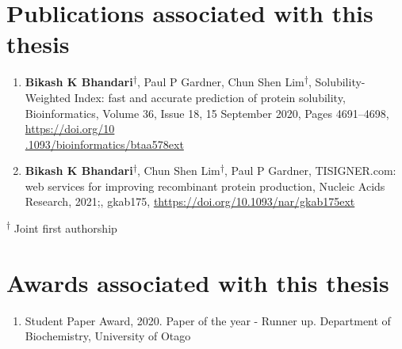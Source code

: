 \section*{Publications associated with this thesis}
\begin{enumerate}
	\item \textbf{Bikash K Bhandari}\textsuperscript{$\dagger$}, Paul P Gardner, Chun Shen Lim\textsuperscript{$\dagger$}, Solubility-Weighted Index: fast and accurate prediction of protein solubility, Bioinformatics, Volume 36, Issue 18, 15 September 2020, Pages 4691–4698, \href{https://doi.org/10.1093/bioinformatics/btaa578}{https://doi.org/10\\.1093/bioinformatics/btaa578ext}
	
	
	\item \textbf{Bikash K Bhandari}\textsuperscript{$\dagger$}, Chun Shen Lim\textsuperscript{$\dagger$}, Paul P Gardner, TISIGNER.com: web services for improving recombinant protein production, Nucleic Acids Research, 2021;, gkab175, \href{https://doi.org/10.1093/nar/gkab175}{thttps://doi.org/10.1093/nar/gkab175ext}
	
\end{enumerate}

\textsuperscript{$\dagger$} Joint first authorship



\section*{Awards associated with this thesis}
\begin{enumerate}
	\item Student Paper Award, 2020. Paper of the year - Runner up. Department of Biochemistry, University of Otago

\end{enumerate}